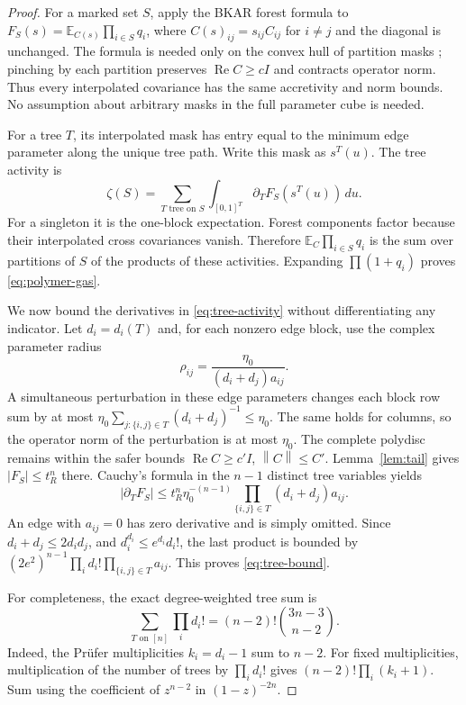 \documentclass[11pt]{article}
\theoremstyle{remark}
\newcommand{\E}{\mathbb E}
\newcommand{\Rea}{\operatorname{Re}}
\newcommand{\norm}[1]{\left\|#1\right\|}
\begin{document}
\begin{proof}
For a marked set $S$, apply the BKAR forest formula to
$F_S(s)=\E_{C(s)}\prod_{i\in S}q_i$, where
$C(s)_{ij}=s_{ij}C_{ij}$ for $i\ne j$ and the diagonal is unchanged.
The formula is needed only on the convex hull of partition masks
\cite{bkar,abdriv}; pinching by each partition preserves
$\Rea C\ge cI$ and contracts operator norm. Thus every interpolated
covariance has the same accretivity and norm bounds. No assumption
about arbitrary masks in the full parameter cube is needed.

For a tree $T$, its interpolated mask has entry equal to the minimum
edge parameter along the unique tree path. Write this mask as $s^T(u)$.
The tree activity is
\begin{equation}\label{eq:tree-activity}
 \zeta(S)=\sum_{T\text{ tree on }S}
 \int_{[0,1]^T}\partial_TF_S(s^T(u))\,du.
\end{equation}
For a singleton it is the one-block expectation. Forest components
factor because their interpolated cross covariances vanish. Therefore
$\E_C\prod_{i\in S}q_i$ is the sum over partitions of $S$ of the
products of these activities. Expanding $\prod(1+q_i)$ proves
\eqref{eq:polymer-gas}.

We now bound the derivatives in \eqref{eq:tree-activity} without
differentiating any indicator. Let $d_i=d_i(T)$ and, for each nonzero
edge block, use the complex parameter radius
\[
 \rho_{ij}=\frac{\eta_0}{(d_i+d_j)a_{ij}}.
\]
A simultaneous perturbation in these edge parameters changes each
block row sum by at most
$\eta_0\sum_{j:\{i,j\}\in T}(d_i+d_j)^{-1}\le\eta_0$.
The same holds for columns, so the operator norm of the perturbation
is at most $\eta_0$. The complete polydisc remains within the safer
bounds $\Rea C\ge c'I$, $\norm C\le C'$.
Lemma~\ref{lem:tail} gives $|F_S|\le t_R^n$ there. Cauchy's formula
in the $n-1$ distinct tree variables yields
\[
 |\partial_TF_S|
 \le t_R^n\eta_0^{-(n-1)}
       \prod_{\{i,j\}\in T}(d_i+d_j)a_{ij}.
\]
An edge with $a_{ij}=0$ has zero derivative and is simply omitted.
Since $d_i+d_j\le2d_id_j$, and
$d_i^{d_i}\le e^{d_i}d_i!$, the last product is bounded by
$(2e^2)^{n-1}\prod_i d_i!\prod_{\{i,j\}\in T}a_{ij}$.
This proves \eqref{eq:tree-bound}.

For completeness, the exact degree-weighted tree sum is
\begin{equation}\label{eq:prufer}
 \sum_{T\text{ on }[n]}\prod_i d_i!
 =(n-2)!\binom{3n-3}{n-2}.
\end{equation}
Indeed, the Pr\"ufer multiplicities $k_i=d_i-1$ sum to $n-2$.
For fixed multiplicities, multiplication of the number of trees by
$\prod_i d_i!$ gives $(n-2)!\prod_i(k_i+1)$.
Sum using the coefficient of $z^{n-2}$ in $(1-z)^{-2n}$.


\end{proof}
\end{document}
